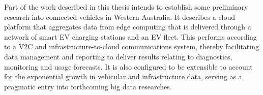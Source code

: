 Part of the work described in this thesis intends to establish some preliminary research into connected vehicles in Western Australia. It describes a cloud platform that aggregates data from edge computing that is delivered through a network of smart EV charging stations and an EV fleet. This performs according to a V2C and infrastructure-to-cloud communications system, thereby facilitating data management and reporting to deliver results relating to diagnostics, monitoring and usage forecasts. It is also configured to be extensible to account for the exponential growth in vehicular and infrastructure data, serving as a pragmatic entry into forthcoming big data researches. 





%



